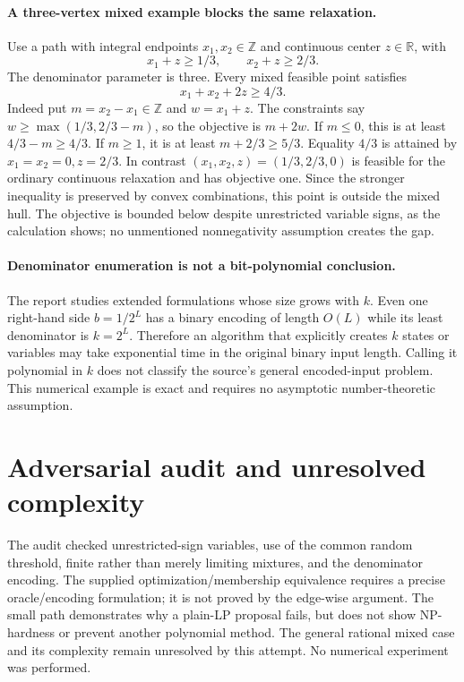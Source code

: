 \documentclass[11pt]{article}
\begin{document}
\paragraph{A three-vertex mixed example blocks the same relaxation.}
Use a path with integral endpoints $x_1,x_2\in\mathbb Z$ and continuous
center $z\in\mathbb R$, with
\[
x_1+z\ge1/3,\qquad x_2+z\ge2/3.
\]
The denominator parameter is three. Every mixed feasible point satisfies
\[
x_1+x_2+2z\ge4/3.
\]
Indeed put $m=x_2-x_1\in\mathbb Z$ and $w=x_1+z$. The constraints
say $w\ge\max(1/3,2/3-m)$, so the objective is $m+2w$.
If $m\le0$, this is at least $4/3-m\ge4/3$.
If $m\ge1$, it is at least $m+2/3\ge5/3$.
Equality $4/3$ is attained by $x_1=x_2=0,z=2/3$.
In contrast $(x_1,x_2,z)=(1/3,2/3,0)$ is feasible for the ordinary
continuous relaxation and has objective one. Since the stronger inequality
is preserved by convex combinations, this point is outside the mixed hull.
The objective is bounded below despite unrestricted variable signs, as the
calculation shows; no unmentioned nonnegativity assumption creates the gap.

\paragraph{Denominator enumeration is not a bit-polynomial conclusion.}
The report studies extended formulations whose size grows with $k$.
Even one right-hand side $b=1/2^L$ has a binary encoding of length $O(L)$
while its least denominator is $k=2^L$. Therefore an algorithm that
explicitly creates $k$ states or variables may take exponential time in
the original binary input length. Calling it polynomial in $k$ does not
classify the source's general encoded-input problem. This numerical example
is exact and requires no asymptotic number-theoretic assumption.

\section{Adversarial audit and unresolved complexity}
The audit checked unrestricted-sign variables, use of the common random
threshold, finite rather than merely limiting mixtures, and the denominator
encoding. The supplied optimization/membership equivalence requires a precise
oracle/encoding formulation; it is not proved by the edge-wise argument.
The small path demonstrates why a plain-LP proposal fails, but does not show
NP-hardness or prevent another polynomial method. The general rational mixed
case and its complexity remain unresolved by this attempt. No numerical
experiment was performed.
\end{document}
